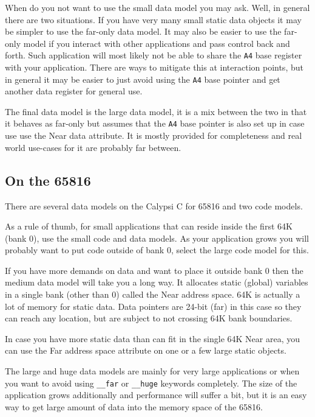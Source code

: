 When do you not want to use the small data model you may ask. Well, in
general there are two situations. If you have very many small static
data objects it may be simpler to use the far-only data model. It may
also be easier to use the far-only model if you interact with other
applications and pass control back and forth. Such application will
most likely not be able to share the {\tt A4} base register with your
application. There are ways to mitigate this at interaction points,
but in general it may be easier to just avoid using the {\tt A4} base
pointer and get another data register for general use.

The final data model is the large data model, it is a mix between the
two in that it behaves as far-only but assumes that the {\tt A4} base
pointer is also set up in case use use the Near data attribute. It is
mostly provided for completeness and real world use-cases for it are
probably far between.

\subsection*{On the 65816}

There are several data models on the Calypsi C for 65816 and two code
models.

As a rule of thumb, for small applications that can reside inside the
first 64K (bank 0), use the small code and data models. As your
application grows you will probably want to put code outside of bank
0, select the large code model for this.

If you have more demands on data and want to place it outside bank 0
then the medium data model will take you a long way. It allocates static
(global) variables in a single bank (other than 0) called the Near
address space. 64K is actually a lot of memory for static data. Data pointers
are 24-bit (far) in this case so they can reach any location, but are
subject to not crossing 64K bank boundaries.

In case you have more static data than can fit in the single 64K Near
area, you can use the Far address space attribute on one or a
few large static objects.

The large and huge data models are mainly for very large applications
or when you want to avoid using {\tt \_\_far} or {\tt \_\_huge}
keywords completely. The size of the application grows additionally and
performance will suffer a bit, but it is an easy way to get large
amount of data into the memory space of the 65816.

